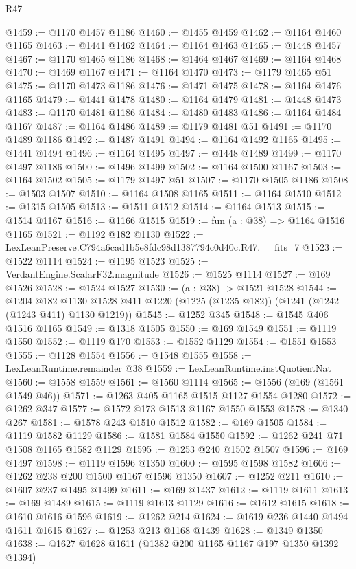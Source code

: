 \begin{lexlean}{R47}
\begin{coremodule}
@1459 := @1170 @1457 @1186
@1460 := @1455 @1459
@1462 := @1164 @1460 @1165
@1463 := @1441 @1462
@1464 := @1164 @1463
@1465 := @1448 @1457
@1467 := @1170 @1465 @1186
@1468 := @1464 @1467
@1469 := @1164 @1468
@1470 := @1469 @1167
@1471 := @1164 @1470
@1473 := @1179 @1465 @51
@1475 := @1170 @1473 @1186
@1476 := @1471 @1475
@1478 := @1164 @1476 @1165
@1479 := @1441 @1478
@1480 := @1164 @1479
@1481 := @1448 @1473
@1483 := @1170 @1481 @1186
@1484 := @1480 @1483
@1486 := @1164 @1484 @1167
@1487 := @1164 @1486
@1489 := @1179 @1481 @51
@1491 := @1170 @1489 @1186
@1492 := @1487 @1491
@1494 := @1164 @1492 @1165
@1495 := @1441 @1494
@1496 := @1164 @1495
@1497 := @1448 @1489
@1499 := @1170 @1497 @1186
@1500 := @1496 @1499
@1502 := @1164 @1500 @1167
@1503 := @1164 @1502
@1505 := @1179 @1497 @51
@1507 := @1170 @1505 @1186
@1508 := @1503 @1507
@1510 := @1164 @1508 @1165
@1511 := @1164 @1510
@1512 := @1315 @1505
@1513 := @1511 @1512
@1514 := @1164 @1513
@1515 := @1514 @1167
@1516 := @1166 @1515
@1519 := fun (a : @38) => @1164 @1516 @1165
@1521 := @1192 @182 @1130
@1522 := LexLeanPreserve.C794a6cad1b5e8fdc98d1387794c0d40c.R47.__fits_7
@1523 := @1522 @1114
@1524 := @1195 @1523
@1525 := VerdantEngine.ScalarF32.magnitude
@1526 := @1525 @1114
@1527 := @169 @1526
@1528 := @1524 @1527
@1530 := (a : @38) -> @1521 @1528
@1544 := @1204
    @182
    @1130
    @1528
    @411
    @1220
    (@1225 (@1235 @182))
    (@1241 (@1242 (@1243 @411) @1130 @1219))
@1545 := @1252 @345
@1548 := @1545 @406 @1516 @1165
@1549 := @1318 @1505
@1550 := @169 @1549
@1551 := @1119 @1550
@1552 := @1119 @170
@1553 := @1552 @1129
@1554 := @1551 @1553
@1555 := @1128 @1554
@1556 := @1548 @1555
@1558 := LexLeanRuntime.remainder @38
@1559 := LexLeanRuntime.instQuotientNat
@1560 := @1558 @1559
@1561 := @1560 @1114
@1565 := @1556 (@169 (@1561 @1549 @46))
@1571 := @1263 @405 @1165 @1515 @1127 @1554 @1280
@1572 := @1262 @347
@1577 := @1572 @173 @1513 @1167 @1550 @1553
@1578 := @1340 @267
@1581 := @1578 @243 @1510 @1512
@1582 := @169 @1505
@1584 := @1119 @1582 @1129
@1586 := @1581 @1584 @1550
@1592 := @1262 @241 @71 @1508 @1165 @1582 @1129
@1595 := @1253 @240 @1502 @1507
@1596 := @169 @1497
@1598 := @1119 @1596 @1350
@1600 := @1595 @1598 @1582
@1606 := @1262 @238 @200 @1500 @1167 @1596 @1350
@1607 := @1252 @211
@1610 := @1607 @237 @1495 @1499
@1611 := @169 @1437
@1612 := @1119 @1611
@1613 := @169 @1489
@1615 := @1119 @1613 @1129
@1616 := @1612 @1615
@1618 := @1610 @1616 @1596
@1619 := @1262 @214
@1624 := @1619 @236 @1440 @1494 @1611 @1615
@1627 := @1253 @213 @1168 @1439
@1628 := @1349 @1350
@1638 := @1627 @1628 @1611 (@1382 @200 @1165 @1167 @197 @1350 @1392 @1394)

\end{coremodule}
\end{lexlean}

